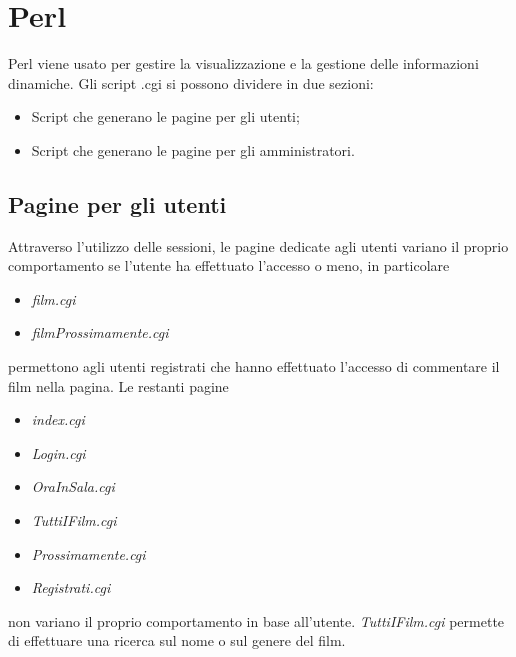 \documentclass[../Relazione.tex]{subfiles}
\begin{document}
\section{Perl}

Perl viene usato per gestire la visualizzazione e la gestione delle informazioni
dinamiche. Gli script .cgi si possono dividere in due sezioni:
\begin{itemize}
\item Script che generano le pagine per gli utenti;
\item Script che generano le pagine per gli amministratori.
\end{itemize}
\subsection{Pagine per gli utenti}
Attraverso l'utilizzo delle sessioni, le pagine dedicate agli utenti variano il proprio comportamento se l'utente ha effettuato l'accesso o meno, in particolare
\begin{itemize}
\item \textit{film.cgi}
\item \textit{filmProssimamente.cgi}
\end{itemize}
permettono agli utenti registrati che hanno effettuato l'accesso di commentare il film nella pagina. Le restanti pagine
\begin{itemize}
\item \textit{index.cgi}
\item \textit{Login.cgi}
\item \textit{OraInSala.cgi}
\item \textit{TuttiIFilm.cgi}
\item \textit{Prossimamente.cgi}
\item \textit{Registrati.cgi}
\end{itemize}
non variano il proprio comportamento in base all'utente. \textit{TuttiIFilm.cgi} permette di effettuare una ricerca sul nome o sul genere del film.
\end{document}
